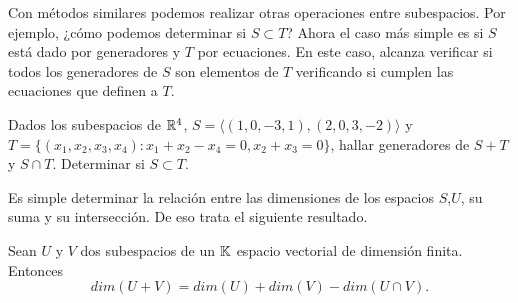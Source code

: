 Con métodos similares podemos realizar otras operaciones entre subespacios. Por ejemplo, ¿cómo podemos determinar si $S \subset T$? Ahora el caso más simple es si $S$ está dado por generadores y $T$ por ecuaciones. En este caso, alcanza verificar si todos los generadores de $S$ son elementos de $T$ verificando si cumplen las ecuaciones que definen a $T$.

\begin{ejercicio}
Dados los subespacios de $\mathbb R^4$, $S = \langle (1, 0, -3, 1), (2, 0, 3, -2)\rangle$ y $T = \{(x_1, x_2, x_3, x_4): x_1+x_2-x_4 = 0, x_2 + x_3 = 0\}$, hallar generadores de $S+T$ y $S \cap T$. Determinar si $S \subset T$.
\end{ejercicio}
Es simple determinar la relación entre las dimensiones de los espacios $S$,$U$, su suma y su intersección. De eso trata el siguiente resultado.
\begin{prop}\label{prop:dimsum}
Sean $U$ y $V$ dos subespacios de un $\mathbb K$ espacio vectorial de dimensión finita. Entonces
$$
dim(U+ V)=dim(U)+dim(V)-dim(U\cap V).
$$
\end{prop}
